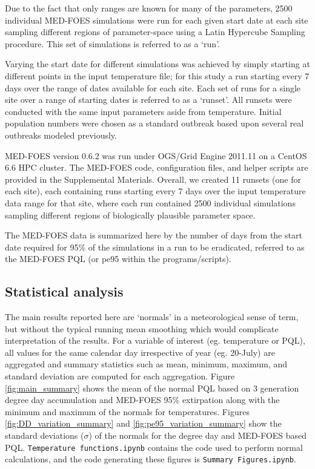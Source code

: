 \documentclass[10pt,a4paper,twocolumn]{article}
\begin{document}
Due to the fact that only ranges are known for many of the parameters,
2500 individual MED-FOES simulations were run for each given start date at each site 
sampling different regions of parameter-space using a Latin Hypercube Sampling\cite{10.2307/1403510} procedure.
This set of simulations is referred to as a `run'.

Varying the start date for different simulations was achieved by simply 
starting at different points in the input temperature file; 
for this study a run starting every 7 days over the range of dates available for each site.
Each set of runs for a single site over a range of starting dates is referred to as a `runset'.
All runsets were conducted with the same input parameters aside from temperature.
Initial population numbers were chosen as a standard outbreak based upon several real 
outbreaks modeled previously\cite{manoukis_agent-based_2014}.

MED-FOES version 0.6.2 was run under OGS/Grid Engine 2011.11 on a CentOS 6.6 HPC cluster.
The MED-FOES code, configuration files, and helper scripts are provided in the Supplemental Materials.
Overall, we created 11 runsets (one for each site), 
each containing runs starting every 7 days over the input temperature data range for that site,
where each run contained 2500 individual simulations sampling different regions of 
biologically plausible parameter space.

The MED-FOES data is summarized here by the number of days from the start date required for
95\% of the simulations in a run to be eradicated, referred to as the MED-FOES PQL
(or pe95 within the programs/scripts).


\subsection*{Statistical analysis}

The main results reported here are `normals' in a meteorological sense of term,
but without the typical running mean smoothing which would complicate
interpretation of the results.
For a variable of interest (eg. temperature or PQL), 
all values for the same calendar day irrespective of year (eg. 20-July) are
aggregated and summary statistics such as mean, minimum, maximum, and standard deviation 
are computed for each aggregation.
Figure \ref{fig:main_summary} shows 
the mean of the normal PQL based on 3 generation degree day accumulation 
and MED-FOES 95\% extirpation
along with the minimum and maximum of the normals for temperatures.
Figures \ref{fig:DD_variation_summary} and \ref{fig:pe95_variation_summary} show the 
standard deviations ($\sigma$) of the normals for the degree day and MED-FOES based PQL.
\texttt{Temperature functions.ipynb} contains the code used to perform normal calculations, 
and the code generating these figures is \texttt{Summary Figures.ipynb}.
\end{document}
